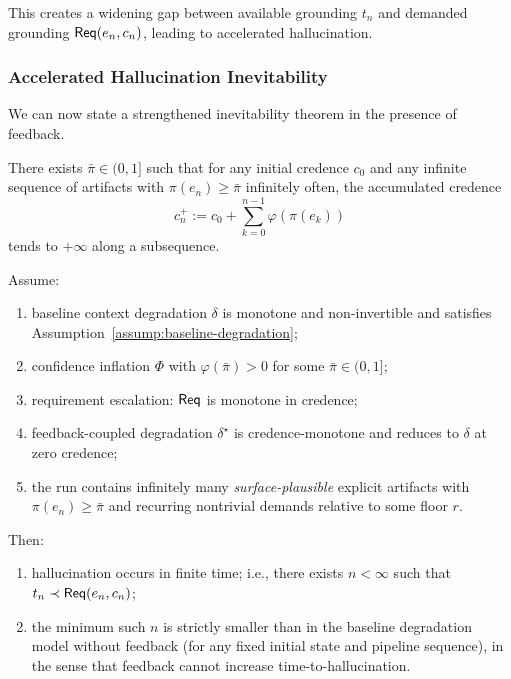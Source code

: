 This creates a widening gap between available grounding \(t_n\) and
demanded grounding \(\mathsf{Req}(e_n,c_n)\), leading to accelerated
hallucination.

\subsubsection{Accelerated Hallucination Inevitability}

We can now state a strengthened inevitability theorem in the presence
of feedback.

\begin{assumption}
There exists \(\bar{\pi} \in (0,1]\) such that for any initial credence
\(c_0\) and any infinite sequence of artifacts with
\(\pi(e_n) \ge \bar{\pi}\) infinitely often, the accumulated credence
\[
c_n^{+} := c_0 + \sum_{k=0}^{n-1} \varphi(\pi(e_k))
\]
tends to \(+\infty\) along a subsequence.
\end{assumption}

\begin{theorem}
\label{thm:accelerated-inevitability}
Assume:
\begin{enumerate}
  \item baseline context degradation \(\delta\) is monotone and
        non-invertible and satisfies
        Assumption~\ref{assump:baseline-degradation};
  \item confidence inflation \(\Phi\) with
        \(\varphi(\bar{\pi}) > 0\) for some \(\bar{\pi}\in(0,1]\);
  \item requirement escalation: \(\mathsf{Req}\) is monotone in credence;
  \item feedback-coupled degradation \(\delta^\star\) is credence-monotone
        and reduces to \(\delta\) at zero credence;
  \item the run contains infinitely many \emph{surface-plausible}
        explicit artifacts with \(\pi(e_n) \ge \bar{\pi}\) and recurring
        nontrivial demands relative to some floor \(r\).
\end{enumerate}
Then:
\begin{enumerate}
  \item hallucination occurs in finite time; i.e., there exists
        \(n < \infty\) such that \(t_n \prec \mathsf{Req}(e_n,c_n)\);
  \item the minimum such \(n\) is strictly smaller than in the baseline
        degradation model without feedback (for any fixed initial
        state and pipeline sequence), in the sense that feedback cannot
        increase time-to-hallucination.
\end{enumerate}
\end{theorem}

